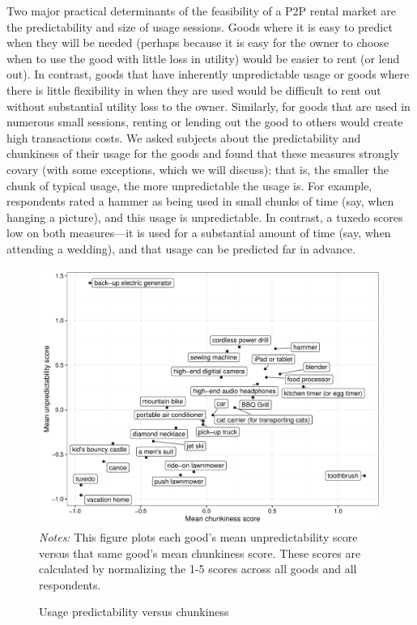 \documentclass[11pt]{article}
\begin{document}
Two major practical determinants of the feasibility of a P2P rental market are the predictability and size of usage sessions.
Goods where it is easy to predict when they will be needed (perhaps because it is easy for the owner to choose when to use the good with little loss in utility) would be easier to rent (or lend out).
In contrast, goods that have inherently unpredictable usage or goods where there is little flexibility in when they are used would be difficult to rent out without substantial utility loss to the owner.
Similarly, for goods that are used in numerous small sessions, renting or lending out the good to others would create high transactions costs.
We asked subjects about the predictability and chunkiness of their usage for the goods and found that these measures strongly covary (with some exceptions, which we will discuss):
that is, the smaller the chunk of typical usage, the more unpredictable the usage is.
For example, respondents rated a hammer as being used in small chunks of time (say, when hanging a picture), and this usage is unpredictable. 
In contrast, a tuxedo scores low on both measures---it is used for a substantial amount of time (say, when attending a wedding), and that usage can be predicted far in advance.  

\begin{figure}
\centering 
\caption{Usage predictability versus chunkiness \label{fig:granularity_v_predictability}}
\begin{minipage}{0.90 \linewidth}
  \includegraphics[width = \linewidth]{./plots/granularity_versus_predictability.pdf} \\
  {\footnotesize 
    \emph{Notes:} This figure plots each good's mean unpredictability score versus that same good's mean chunkiness score.
    These scores are calculated by normalizing the 1-5 scores across all goods and all respondents. 
   }
\end{minipage} 
\end{figure} 
\end{document}
